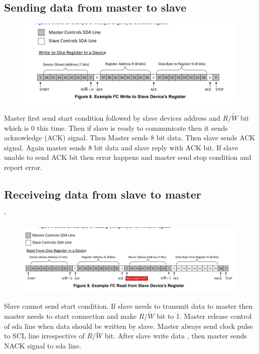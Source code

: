 \documentclass{article}
\begin{document}
\subsection{Sending data from master to slave}
\begin{figure}[h!]
	\centering
	\includegraphics[scale=0.5]{images/master-write.png}
\end{figure}
Master first send start condition followed by slave devices address and $R/\tilde{W}$ bit which is 0 this time.
Then if slave is ready to communicate then it sends acknowledge (ACK) signal. 
Then Master sends 8 bit data. Then slave sends ACK signal. Again master sends 8 bit data and slave reply with ACK bit. If slave unable to send ACK bit then error happens and master send stop condition and report error.

\subsection{Receiveing data from slave to master}
'\begin{figure}[h!]
	\centering
	\includegraphics[scale=0.53]{images/master-read.png}
\end{figure}

Slave cannot send start condition. If slave needs to transmit data to master then master needs to start connection and make $R/\tilde{W}$ bit to 1. 
Master release control of sda line when data should be written by slave.
Master always send clock pulse to SCL line irrespective of $R/\tilde{W}$ bit. 
After slave write data , then master sends NACK signal to sda line. 
\end{document}

